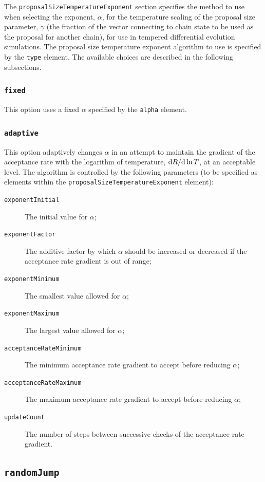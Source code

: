 The {\tt proposalSizeTemperatureExponent} section specifies the method to use when selecting the exponent, $\alpha$, for the temperature scaling of the proposal size parameter, $\gamma$ (the fraction of the vector connecting to chain state to be used as the proposal for another chain), for use in tempered differential evolution simulations. The proposal size temperature exponent algorithm to use is specified by the {\tt type} element. The available choices are described in the following subsections.

\subsubsection{{\tt fixed}}

This option uses a fixed $\alpha$ specified by the {\tt alpha} element.

\subsubsection{{\tt adaptive}}

This option adaptively changes $\alpha$ in an attempt to maintain the gradient of the acceptance rate with the logarithm of temperature, ${\rm d} R/{\rm d}\ln T$, at an acceptable level. The algorithm is controlled by the following parameters (to be specified as elements within the {\tt proposalSizeTemperatureExponent} element):
\begin{description}
\item[{\tt exponentInitial}] The initial value for $\alpha$;
\item[{\tt exponentFactor}] The additive factor by which $\alpha$ should be increased or decreased if the acceptance rate gradient is out of range;
\item[{\tt exponentMinimum}] The smallest value allowed for $\alpha$;
\item[{\tt exponentMaximum}] The largest value allowed for $\alpha$;
\item[{\tt acceptanceRateMinimum}] The minimum acceptance rate gradient to accept before reducing $\alpha$;
\item[{\tt acceptanceRateMaximum}] The maximum acceptance rate gradient to accept before reducing $\alpha$;
\item[{\tt updateCount}] The number of steps between successive checks of the acceptance rate gradient.
\end{description}


\subsection{{\tt randomJump}}

